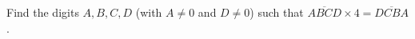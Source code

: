 Find the digits $A,B,C,D$ (with $A\ne0$ and $D\ne0$) such that $\overline{ABCD}\times4=\overline{DCBA}$.
